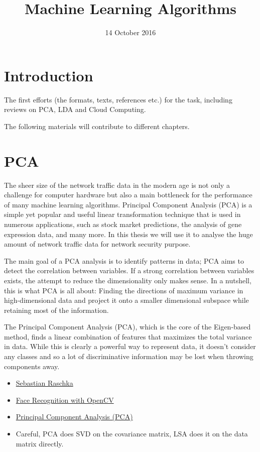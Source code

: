 \documentclass[a4paper]{article}
\title{Machine Learning Algorithms}
\author{}
\date{14 October 2016}
\begin{document}
\maketitle
	

\section{Introduction}

The first efforts (the formats, texts, references etc.) for the task, including reviews on PCA, LDA and Cloud Computing.

The following materials will contribute to different chapters.

\section{PCA}
The sheer size of the network traffic data in the modern age is not only a challenge for computer hardware but also a main bottleneck for the performance of many machine learning algorithms. Principal Component Analysis (PCA) is a simple yet popular and useful linear transformation technique that is used in numerous applications, such as stock market predictions, the analysis of gene expression data, and many more. In this thesis we will use it to analyse the huge amount of network traffic data for network security purpose. 

The main goal of a PCA analysis is to identify patterns in data; PCA aims to detect the correlation between variables. If a strong correlation between variables exists, the attempt to reduce the dimensionality only makes sense. In a nutshell, this is what PCA is all about: Finding the directions of maximum variance in high-dimensional data and project it onto a smaller dimensional subspace while retaining most of the information.

The Principal Component Analysis (PCA), which is the core of the Eigen-based method, finds a linear combination of features that maximizes the total variance in data. While this is clearly a powerful way to represent data, it doesn’t consider any classes and so a lot of discriminative information may be lost when throwing components away.

\begin{itemize}
	\item \href{http://sebastianraschka.com/Articles/2015_pca_in_3_steps.html}{Sebastian Raschka}
	\item \href{http://docs.opencv.org/2.4/modules/contrib/doc/facerec/facerec_tutorial.html}{Face Recognition with OpenCV}
	\item \href{https://www.reddit.com/r/math/comments/1vu9ev/principal_component_analysis_pca/}{Principal Component Analysis (PCA)}
	\item Careful, PCA does SVD on the covariance matrix, LSA does it on the data matrix directly.
\end{itemize}
\end{document}
